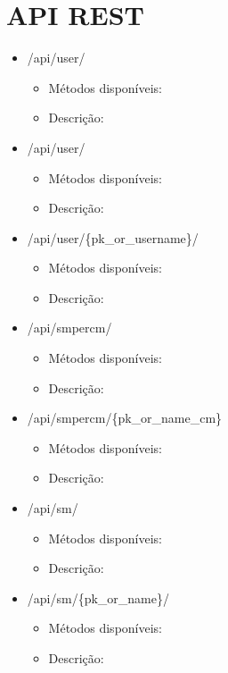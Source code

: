 \chapter{\acl{API} \acs{REST}}
\label{espcifAPIREST}


\begin{itemize}
	\item /api/user/
		\begin{itemize}
			\item Métodos disponíveis: 
			\item Descrição: 
		\end{itemize}

	\item /api/user/
		\begin{itemize}
			\item Métodos disponíveis: 
			\item Descrição: 
		\end{itemize}
	
	\item /api/user/\{pk\_or\_username\}/
		\begin{itemize}
			\item Métodos disponíveis: 
			\item Descrição: 
		\end{itemize}
		
	\item /api/smpercm/
	\begin{itemize}
		\item Métodos disponíveis: 
		\item Descrição: 
	\end{itemize}
	
	
	
	\item /api/smpercm/\{pk\_or\_name\_cm\}
	\begin{itemize}
		\item Métodos disponíveis: 
		\item Descrição: 
	\end{itemize}
	
	
	\item /api/sm/
	\begin{itemize}
		\item Métodos disponíveis: 
		\item Descrição: 
	\end{itemize}
	
	
	\item /api/sm/\{pk\_or\_name\}/
	\begin{itemize}
		\item Métodos disponíveis: 
		\item Descrição: 
	\end{itemize}
	

\end{itemize}
